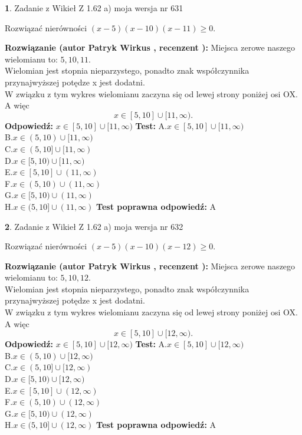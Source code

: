 \documentclass[12pt, a4paper]{article}
\theoremstyle{definition} %
\newtheorem{zad}{}
\newcommand{\zadStart}[1]{\begin{zad}#1\newline}
\newcommand{\zadStop}{\end{zad}}
\newcommand{\rozwStart}[2]{\noindent \textbf{Rozwiązanie (autor #1 , recenzent #2): }\newline}
\newcommand{\rozwStop}{\newline}
\newcommand{\odpStart}{\noindent \textbf{Odpowiedź:}\newline}
\newcommand{\odpStop}{\newline}
\newcommand{\testStart}{\noindent \textbf{Test:}\newline}
\newcommand{\testStop}{\newline}
\newcommand{\kluczStart}{\noindent \textbf{Test poprawna odpowiedź:}\newline}
\newcommand{\kluczStop}{\newline}
\begin{document}
\zadStart{Zadanie z Wikieł Z 1.62 a) moja wersja nr 631}

Rozwiązać nierówności $(x-5)(x-10)(x-11)\ge0$.
\zadStop
\rozwStart{Patryk Wirkus}{}
Miejsca zerowe naszego wielomianu to: $5, 10, 11$.\\
Wielomian jest stopnia nieparzystego, ponadto znak współczynnika przy\linebreak najwyższej potędze x jest dodatni.\\ W związku z tym wykres wielomianu zaczyna się od lewej strony poniżej osi OX. A więc $$x \in [5,10] \cup [11,\infty).$$
\rozwStop
\odpStart
$x \in [5,10] \cup [11,\infty)$
\odpStop
\testStart
A.$x \in [5,10] \cup [11,\infty)$\\
B.$x \in (5,10) \cup [11,\infty)$\\
C.$x \in (5,10] \cup [11,\infty)$\\
D.$x \in [5,10) \cup [11,\infty)$\\
E.$x \in [5,10] \cup (11,\infty)$\\
F.$x \in (5,10) \cup (11,\infty)$\\
G.$x \in [5,10) \cup (11,\infty)$\\
H.$x \in (5,10] \cup (11,\infty)$
\testStop
\kluczStart
A
\kluczStop



\zadStart{Zadanie z Wikieł Z 1.62 a) moja wersja nr 632}

Rozwiązać nierówności $(x-5)(x-10)(x-12)\ge0$.
\zadStop
\rozwStart{Patryk Wirkus}{}
Miejsca zerowe naszego wielomianu to: $5, 10, 12$.\\
Wielomian jest stopnia nieparzystego, ponadto znak współczynnika przy\linebreak najwyższej potędze x jest dodatni.\\ W związku z tym wykres wielomianu zaczyna się od lewej strony poniżej osi OX. A więc $$x \in [5,10] \cup [12,\infty).$$
\rozwStop
\odpStart
$x \in [5,10] \cup [12,\infty)$
\odpStop
\testStart
A.$x \in [5,10] \cup [12,\infty)$\\
B.$x \in (5,10) \cup [12,\infty)$\\
C.$x \in (5,10] \cup [12,\infty)$\\
D.$x \in [5,10) \cup [12,\infty)$\\
E.$x \in [5,10] \cup (12,\infty)$\\
F.$x \in (5,10) \cup (12,\infty)$\\
G.$x \in [5,10) \cup (12,\infty)$\\
H.$x \in (5,10] \cup (12,\infty)$
\testStop
\kluczStart
A
\kluczStop
\end{document}
